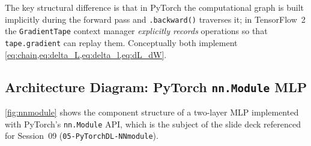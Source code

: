 \documentclass[12pt,a4paper]{article}
\begin{document}
The key structural difference is that in PyTorch the computational
graph is built implicitly during the forward pass and
\texttt{.backward()} traverses it; in TensorFlow~2 the
\texttt{GradientTape} context manager \emph{explicitly records}
operations so that \texttt{tape.gradient} can replay them.  Conceptually
both implement \cref{eq:chain,eq:delta_L,eq:delta_l,eq:dL_dW}.

\subsection{Architecture Diagram: PyTorch \texttt{nn.Module} MLP}
\label{ssec:tikz_nnmodule}

\cref{fig:nnmodule} shows the component structure of a two-layer MLP
implemented with PyTorch's \texttt{nn.Module} API, which is the subject
of the slide deck referenced for Session~09
(\texttt{05-PyTorchDL-NNmodule}).
\end{document}
